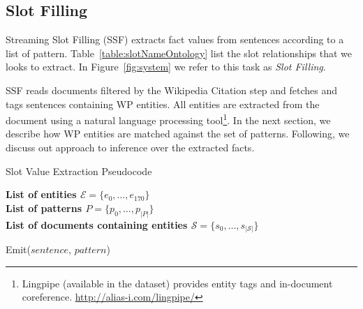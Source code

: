 



\subsection{Slot Filling}
Streaming Slot Filling (SSF) extracts fact values from sentences according to a list of pattern.
Table~\ref{table:slotNameOntology} list the slot relationships that we looks to extract.
In Figure~\ref{fig:system} we refer to this task as \textit{Slot Filling}. 





SSF reads documents filtered by the Wikipedia Citation step and fetches and tags sentences containing WP entities.
All entities are extracted from the document using a natural language processing
tool\footnote{Lingpipe (available in the dataset) provides entity tags
and in-document coreference. \url{http://alias-i.com/lingpipe/}}.
In the next section, we describe how WP entities are matched against the set of patterns.
Following, we discuss out approach to inference over the extracted facts.

\begin{algorithm}
  \caption{Slot Value Extraction Pseudocode}
  \textbf{List of entities $\mathcal{E} = \{e_0, \ldots, e_{170}\}$}\\
  \textbf{List of patterns $P = \{p_0, \ldots, p_{|P|}\}$}\\
  \textbf{List of documents containing entities $\mathcal{S} = \{s_0, \ldots, s_{|\mathcal{S}|}\}$}\\

  \begin{algorithmic}%
    \STATE Emit($sentence$, $pattern$)
  \ENDIF
\ENDFOR
          \ENDIF
        \ENDFOR
      \ENDFOR
    \ENDFOR
  \end{algorithmic}
\end{algorithm}



